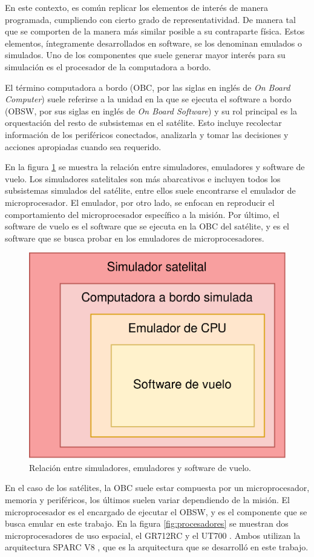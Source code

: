 En este contexto, es común replicar los elementos de interés de manera programada, cumpliendo con cierto grado de representatividad. De manera tal que se comporten de la manera más similar posible a su contraparte física. Estos elementos, íntegramente desarrollados en software, se los denominan emulados o simulados. Uno de los componentes que suele generar mayor interés para su simulación es el procesador de la computadora a bordo.

El término computadora a bordo (OBC, por las siglas en inglés de \textit{On Board Computer}) suele referirse a la unidad en la que se ejecuta el software a bordo (OBSW, por sus siglas en inglés de \textit{On Board Software}) y su rol principal es la orquestación del resto de subsistemas en el satélite. Esto incluye recolectar información de los periféricos conectados, analizarla y tomar las decisiones y acciones apropiadas cuando sea requerido.

En la figura \ref{fig:simu_emu} se muestra la relación entre simuladores, emuladores y software de vuelo. Los simuladores satelitales son más abarcativos e incluyen todos los subsistemas simulados del satélite, entre ellos suele encontrarse el emulador de microprocesador. El emulador, por otro lado, se enfocan en reproducir el comportamiento del microprocesador específico a la misión. Por último, el software de vuelo es el software que se ejecuta en la OBC del satélite, y es el software que se busca probar en los emuladores de microprocesadores.

\begin{figure}[htbp]
	\centering
	\includegraphics[width=.6\textwidth]{./Figures/simu_emu}
	\caption{Relación entre simuladores, emuladores y software de vuelo.}
	\label{fig:simu_emu}
\end{figure}

\newpage

En el caso de los satélites, la OBC suele estar compuesta por un microprocesador, memoria y periféricos, los últimos suelen variar dependiendo de la misión. El microprocesador es el encargado de ejecutar el OBSW, y es el componente que se busca emular en este trabajo. En la figura \ref{fig:procesadores} se muestran dos microprocesadores de uso espacial, el GR712RC \citep{GR712RC} y el UT700 \citep{UT700}. Ambos utilizan la arquitectura SPARC V8 \citep{SPARC}, que es la arquitectura que se desarrolló en este trabajo.

